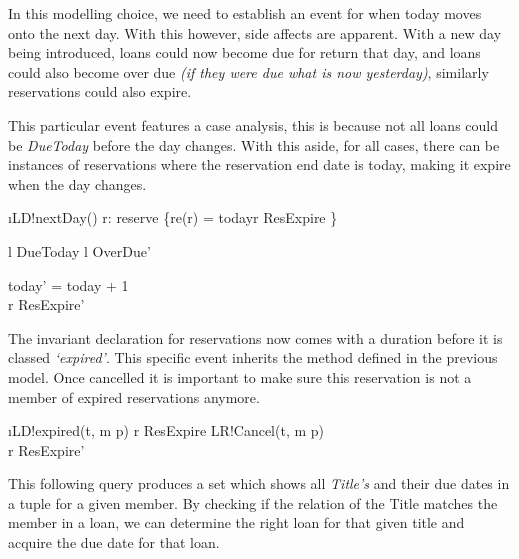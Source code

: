 \documentclass[12pt,a4paper]{article}
\begin{document}
\medskip\noindent In this modelling choice, we need to establish an event for when today moves onto the next day. With this however, side affects are apparent. With a new day being introduced, loans could now become due for return that day, and loans could also become over due \emph{(if they were due what is now yesterday)}, similarly reservations could also expire.

\medskip\noindent This particular event features a case analysis, this is because not all loans could be \emph{DueToday} before the day changes. With this aside, for all cases, there can be instances of reservations where the reservation end date is today, making it expire when the day changes.

\begin{showspecs}
	\begin{spec}{\i{LD!nextDay()}}
		\exists r: reserve \bullet \{re(r) = today\wedge r \notin ResExpire \}\\
		\begin{alt}
			l \in DueToday
		\post
			l \in OverDue'
		\end{alt}
	\post
		today' = today + 1\\
		r \in ResExpire'
	\end{spec}
\end{showspecs}


\medskip\noindent The invariant declaration for reservations now comes with a duration before it is classed \emph{`expired'}. This specific event inherits the method defined in the previous model. Once cancelled it is important to make sure this reservation is not a member of expired reservations anymore.

\begin{showspecs}
	\begin{spec}{\i{LD!expired(t, m \to p)}}
		r \in ResExpire
	\post
		LR!Cancel(t, m \to p)\\
		r \notin ResExpire'
	\end{spec}
\end{showspecs}

\pagebreak

\medskip\noindent This following query produces a set which shows all \emph{Title's} and their due dates in a tuple for a given member. By checking if the relation of the Title matches the member in a loan, we can determine the right loan for that given title and acquire the due date for that loan.
\end{document}
